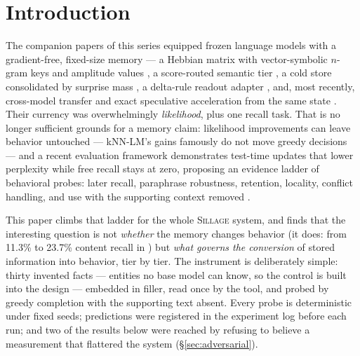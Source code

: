 \documentclass[11pt]{article}
\newcommand{\sillage}{\textsc{Sillage}}
\begin{document}
\begin{abstract}
before each run, is released. \textbf{Version 2 adds the capacity test}: one state written by Qwen3-0.6B, served by 0.6B, 1.7B and 4B under an identical stack --- at published trust, conflict resolution is 10\% at all three sizes; at calibrated trust, 100\% at all three. Capacity does not buy conversion; the readout does, and at 4B the whole trust dial compresses into the abstention threshold alone.
\end{abstract}

\section{Introduction}

The companion papers of this series equipped frozen language models with a gradient-free, fixed-size memory --- a Hebbian matrix with vector-symbolic $n$-gram keys and amplitude values \cite{sillage}, a score-routed semantic tier \cite{router}, a cold store consolidated by surprise mass \cite{hier}, a delta-rule readout adapter \cite{fw}, and, most recently, cross-model transfer and exact speculative acceleration from the same state \cite{drafter}. Their currency was overwhelmingly \emph{likelihood}, plus one recall task. That is no longer sufficient grounds for a memory claim: likelihood improvements can leave behavior untouched --- kNN-LM's gains famously do not move greedy decisions \cite{sillage,khandelwal2020} --- and a recent evaluation framework demonstrates test-time updates that lower perplexity while free recall stays at zero, proposing an evidence ladder of behavioral probes: later recall, paraphrase robustness, retention, locality, conflict handling, and use with the supporting context removed \cite{beyondppl}.

This paper climbs that ladder for the whole \sillage{} system, and finds that the interesting question is not \emph{whether} the memory changes behavior (it does: from 11.3\% to 23.7\% content recall in \cite{sillage}) but \emph{what governs the conversion} of stored information into behavior, tier by tier. The instrument is deliberately simple: thirty invented facts --- entities no base model can know, so the control is built into the design --- embedded in filler, read once by the tool, and probed by greedy completion with the supporting text absent. Every probe is deterministic under fixed seeds; predictions were registered in the experiment log before each run; and two of the results below were reached by refusing to believe a measurement that flattered the system (\S\ref{sec:adversarial}).
\end{document}
